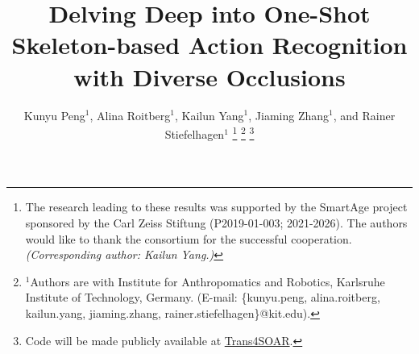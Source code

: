 \documentclass[lettersize,journal]{IEEEtran}
\begin{document}
\title{Delving Deep into One-Shot Skeleton-based Action Recognition with Diverse Occlusions}

\author{Kunyu Peng$^{1}$, Alina Roitberg$^{1}$, Kailun Yang$^{1}$, Jiaming Zhang$^{1}$, and Rainer Stiefelhagen$^{1}$
\thanks{The research leading to these results was supported by the SmartAge project sponsored by the Carl Zeiss Stiftung (P2019-01-003; 2021-2026).
The authors would like to thank the consortium for the successful cooperation.
\textit{(Corresponding author: Kailun Yang.)}
}
\thanks{$^{1}$Authors are with Institute for Anthropomatics and Robotics, Karlsruhe Institute of Technology, Germany. (E-mail: \{kunyu.peng, alina.roitberg, kailun.yang, jiaming.zhang, rainer.stiefelhagen\}@kit.edu).}
\thanks{Code will be made publicly available at \href{https://github.com/KPeng9510/Trans4SOAR}{Trans4SOAR}.}
}

\maketitle
\end{document}
